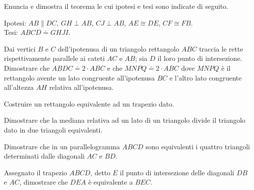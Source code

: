 \begin{multicols}{2}

\begin{esercizio}
\label{ese:7.1}
Enuncia e dimostra il teorema le cui ipotesi e tesi sono indicate 
di seguito.

\noindent Ipotesi: $AB\parallel DC$, $GH\perp AB$, $CJ\perp AB$, 
$AE\cong DE$, $CF\cong FB$.\\
\noindent Tesi: $ABCD\doteq GHJI$.\\

%
\end{esercizio}
 
\begin{esercizio}
\label{ese:7.2}
Dai vertici $B$ e $C$ dell'ipotenusa di un triangolo rettangolo $ABC$ 
traccia le rette rispettivamente parallele ai cateti $AC$ e $AB$; sia 
$D$ il loro punto di intersezione. Dimostrare che $ABDC\doteq 2\cdot 
ABC$ e che $MNPQ\doteq 2\cdot ABC$ dove $MNPQ$ è il rettangolo avente 
un lato congruente all'ipotenusa $BC$ e l'altro lato congruente 
all'altezza $AH$ relativa all'ipotenusa.
\end{esercizio}

\begin{esercizio}
\label{ese:7.3}
Costruire un rettangolo equivalente ad un trapezio dato.
\end{esercizio}

\begin{esercizio}
\label{ese:7.4}
Dimostrare che la mediana relativa ad un lato di un triangolo divide 
il triangolo dato in due triangoli equivalenti.
\end{esercizio}

\begin{esercizio}
\label{ese:7.5}
Dimostrare che in un parallelogramma $ABCD$ sono equivalenti i 
quattro triangoli determinati dalle diagonali $AC$ e $BD$.
\end{esercizio}

\begin{esercizio}
\label{ese:7.6}
Assegnato il trapezio $ABCD$, detto $E$ il punto di intersezione 
delle diagonali $DB$ e $AC$, dimostrare che $DEA$ è equivalente a 
$BEC$.
\end{esercizio}


\end{multicols}

